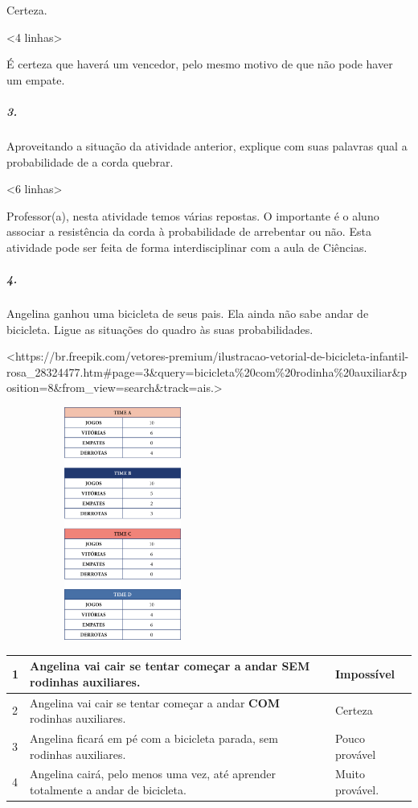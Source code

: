 Certeza.

\textless{}4 linhas\textgreater{}

É certeza que haverá um vencedor, pelo mesmo motivo de que não pode haver um empate.

\subparagraph{3.}\label{section-70}

Aproveitando a situação da atividade anterior, explique com suas
palavras qual a probabilidade de a corda quebrar.

\textless{}6 linhas\textgreater{}

Professor(a), nesta atividade temos várias repostas. O importante é o
aluno associar a resistência da corda à probabilidade de arrebentar ou
não. Esta atividade pode ser feita de forma interdisciplinar com a aula
de Ciências.

\subparagraph{4.}\label{section-71}

Angelina ganhou uma bicicleta de seus pais. Ela ainda não sabe andar de
bicicleta. Ligue as situações do quadro às suas probabilidades.

\textless{}https://br.freepik.com/vetores-premium/ilustracao-vetorial-de-bicicleta-infantil-rosa\_28324477.htm\#page=3\&query=bicicleta\%20com\%20rodinha\%20auxiliar\&position=8\&from\_view=search\&track=ais.\textgreater{}

\includegraphics[width=3.01042in,height=3.01042in]{media/image85.png}

\begin{longtable}[]{@{}llll@{}}
\toprule
1 & Angelina vai cair se tentar começar a andar \textbf{SEM} rodinhas
auxiliares. & & Impossível\tabularnewline
\midrule
\endhead
2 & Angelina vai cair se tentar começar a andar \textbf{COM} rodinhas
auxiliares. & & Certeza\tabularnewline
3 & Angelina ficará em pé com a bicicleta parada, sem rodinhas
auxiliares. & & Pouco provável\tabularnewline
4 & Angelina cairá, pelo menos uma vez, até aprender totalmente a andar
de bicicleta. & & Muito provável.\tabularnewline
\bottomrule
\end{longtable}

